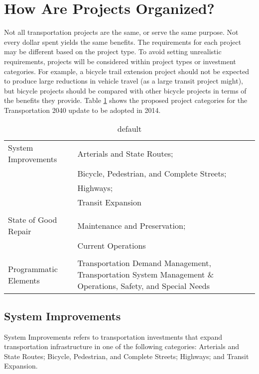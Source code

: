 \documentclass[10pt, letterpaper, final, twoside, onecolumn]{memoir}%
\begin{document}
\section{How Are Projects Organized?}
Not all transportation projects are the same, or serve the same purpose. Not every dollar spent yields the same benefits. The requirements for each project may be different based on the project type. To avoid setting unrealistic requirements, projects will be considered within project types or investment categories. For example, a bicycle trail extension project should not be expected to produce large reductions in vehicle travel (as a large transit project might), but bicycle projects should be compared with other bicycle projects in terms of the benefits they provide. Table \ref{tb:projcats} shows the proposed project categories for the Transportation 2040 update to be adopted in 2014.

\begin{table}[htdp]
\caption{default}
\begin{center}
\begin{tabularx}{0.75\textwidth}{>{\raggedright\arraybackslash}p{9pc}>{\raggedright\arraybackslash}X}
\toprule
System Improvements	&	Arterials and State Routes; \\
&	Bicycle, Pedestrian, and Complete Streets; \\
&	Highways; \\
&	Transit Expansion \\
\\
State of Good Repair	&	Maintenance and Preservation; \\
&	Current Operations \\
\\
Programmatic Elements	&	Transportation Demand Management, Transportation System Management \& Operations, Safety, and Special Needs \\
\bottomrule
\end{tabularx}
\end{center}
\label{tb:projcats}
\end{table}%

\subsection{System Improvements}
System Improvements refers to transportation investments that expand transportation infrastructure in one of the following categories: Arterials and State Routes; Bicycle, Pedestrian, and Complete Streets; Highways; and Transit Expansion.
\end{document}
